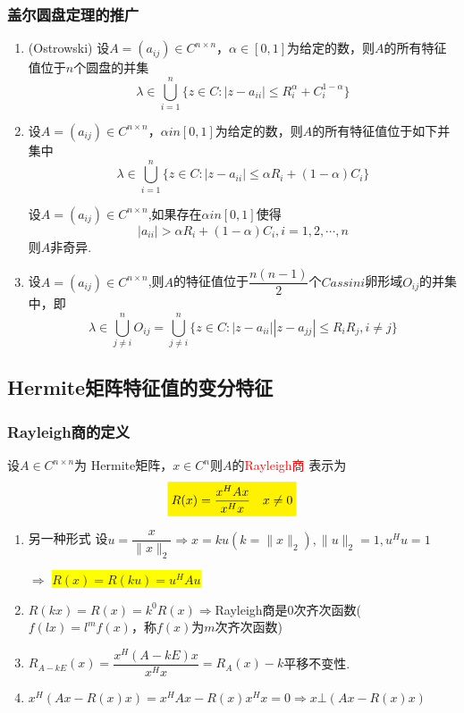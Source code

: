 \subsubsection{盖尔圆盘定理的推广}

\begin{theorem}

\begin{enumerate}
	\item(Ostrowski)	设$A= (a_{ij})\in C^{n\times n}$，$\alpha \in [0,1]$为给定的数，则$A$的所有特征值位于$n$个圆盘的并集
	\[
	\lambda \in \bigcup\limits_{i=1}^{n}\{z\in C:|z-a_{ii}|\leq R_i^\alpha+ C_i^{1-\alpha}\}
	\]
	\item 设$A= (a_{ij})\in C^{n\times n}$，$\alpha in [0,1]$为给定的数，则$A$的所有特征值位于如下并集中
	\[
	\lambda \in \bigcup\limits_{i=1}^{n}\{z\in C:|z-a_{ii}|\leq \alpha R_i +(1-\alpha)C_i\}
	\]
	\begin{corollary}
	设$A= (a_{ij})\in C^{n\times n}$,如果存在$\alpha in [0,1]$使得
	\[
	|a_{ii}|>\alpha R_i +(1-\alpha)C_i,i=1,2,\cdots,n
	\]
则$A$非奇异.
	\end{corollary}
	\item 设$A= (a_{ij})\in C^{n\times n}$,则$A$的特征值位于$\dfrac{n(n-1)}{2}$个$Cassini$卵形域$O_{ij}$的并集中，即
\[
\lambda \in \bigcup\limits_{j\ne i}^{n}O_{ij}= \bigcup\limits_{j\ne i}^{n}\{z\in C:|z-a_{ii}||z-a_{jj}|\leq R_iR_j,i\ne j\}
\]
\end{enumerate}
\end{theorem}

\subsection{Hermite矩阵特征值的变分特征}
\subsubsection{Rayleigh商的定义}

\begin{definition}
	设$A\in C^{n\times n}$为 Hermite矩阵，$x\in C^n$则$A$的\textcolor{red}{Rayleigh商} 表示为
	\[
	\colorbox{yellow}{$R(x)=\dfrac{x^HAx}{x^Hx}\quad x\ne 0$}
	\]
	\begin{note}
		\begin{enumerate}
	\item 另一种形式
	设$u=\dfrac{x}{\|x\|_2}\Rightarrow x=ku(k=\|x\|_2),\|u\|_2=1,u^Hu=1$
	
	$\Rightarrow$ \colorbox{yellow}{$R(x)=R(ku)=u^HAu$}
	\item $R(kx)=R(x)=k^{0}R(x)\Rightarrow$Rayleigh商是0次齐次函数($f(lx)=l^mf(x)$，称$f(x)$为$m$次齐次函数)
	\item $R_{A- kE}(x)=\dfrac{x^H(A-kE)x}{x^Hx}=R_A(x)-k$\quad 平移不变性.
	\item $ x^H\left(Ax-R(x)x\right)=x^HAx-R(x)x^Hx=0\Rightarrow x\bot\left(Ax-R(x)x\right)$
\end{enumerate}
	\end{note}
\end{definition}


